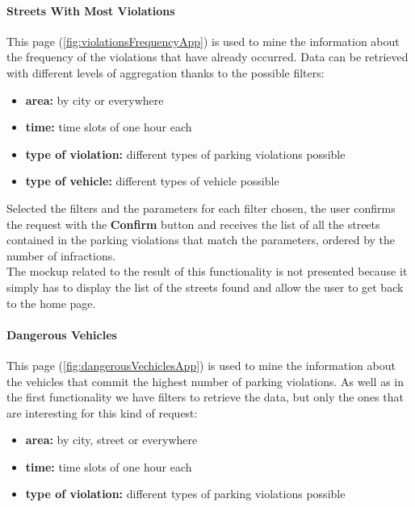 			\paragraph{Streets With Most Violations}
			This page (\autoref{fig:violationsFrequencyApp}) is used to mine the information about the frequency of the violations that have already occurred. Data can be retrieved with different levels of aggregation thanks to the possible filters:
			
			\begin{itemize}
				\item \textbf{area:} by city or everywhere
				\item \textbf{time:} time slots of one hour each
				\item \textbf{type of violation:} different types of parking violations possible
				\item \textbf{type of vehicle:} different types of vehicle possible
			\end{itemize}
		
			Selected the filters and the parameters for each filter chosen, the user confirms the request with the \textbf{Confirm} button and receives the list of all the streets contained in the parking violations that match the parameters, ordered by the number of infractions.\\
			
			The mockup related to the result of this functionality is not presented because it simply has to display the list of the streets found and allow the user to get back to the home page.
			
			\paragraph{Dangerous Vehicles}
			This page (\autoref{fig:dangerousVechiclesApp}) is used to mine the information about the vehicles that commit the highest number of parking violations. As well as in the first functionality we have filters to retrieve the data, but only the ones that are interesting for this kind of request:
			
			\begin{itemize}
				\item \textbf{area:} by city, street or everywhere
				\item \textbf{time:} time slots of one hour each
				\item \textbf{type of violation:} different types of parking violations possible
			\end{itemize}
		
